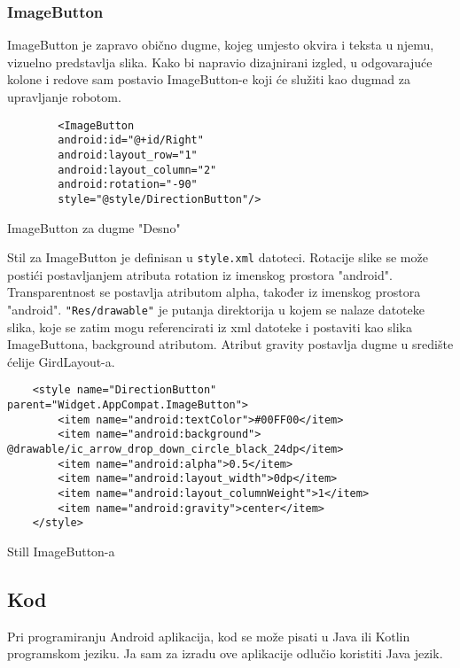 \documentclass[../Document.tex]{subfiles}
\begin{document}
\subsubsection{ImageButton}
ImageButton je zapravo obično dugme, kojeg umjesto okvira i teksta u njemu, vizuelno predstavlja slika. Kako bi napravio dizajnirani izgled, u odgovarajuće kolone i redove sam postavio ImageButton-e koji će služiti kao dugmad za upravljanje robotom.


\begin{code}
    \begin{verbatim}
        <ImageButton
        android:id="@+id/Right"
        android:layout_row="1"
        android:layout_column="2"
        android:rotation="-90"
        style="@style/DirectionButton"/>
    \end{verbatim}
    \caption{ImageButton za dugme "Desno"}
\end{code}

\vspace{0.5cm}
\noindent Stil za ImageButton je definisan u \verb|style.xml| datoteci. Rotacije slike se može postići postavljanjem atributa rotation iz imenskog prostora "android". Transparentnost se postavlja atributom alpha, također iz imenskog prostora "android". \verb|"Res/drawable"| je putanja direktorija u kojem se nalaze datoteke slika, koje se zatim mogu referencirati iz xml datoteke i postaviti kao slika ImageButtona, background atributom. Atribut gravity postavlja dugme u središte ćelije GirdLayout-a.\\

\begin{code}
    \begin{verbatim}
    <style name="DirectionButton" parent="Widget.AppCompat.ImageButton">
        <item name="android:textColor">#00FF00</item>
        <item name="android:background"> @drawable/ic_arrow_drop_down_circle_black_24dp</item>
        <item name="android:alpha">0.5</item>
        <item name="android:layout_width">0dp</item>
        <item name="android:layout_columnWeight">1</item>
        <item name="android:gravity">center</item>
    </style>
    \end{verbatim}
    \caption{Still ImageButton-a}
\end{code}

\subsection{Kod}
Pri programiranju Android aplikacija, kod se može pisati u Java ili Kotlin programskom jeziku. Ja sam za izradu ove aplikacije odlučio koristiti Java jezik.
\end{document}
